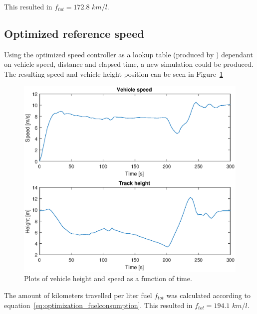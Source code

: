 This resulted in $f_{tot} = 172.8$ $km/l$. %

\subsection{Optimized reference speed}
Using the optimized speed controller as a lookup table (produced by
\citep{liu2016}) dependant on vehicle speed, distance and elapsed time, a new
simulation could be produced. The resulting speed and vehicle height position
can be seen in Figure~\ref{fig:optimization_optimal_speed}

\begin{figure}[H]
    \centering
    \includegraphics[width=\textwidth]{./img/optimization_optimal_speed.eps}
    \caption{Plots of vehicle height and speed as a function of
    time.}\label{fig:optimization_optimal_speed}
\end{figure}

The amount of kilometers travelled per liter fuel $f_{tot}$ was calculated
according to equation~\ref{eq:optimization_fuelconsumption}. This resulted in
$f_{tot} = 194.1$ $km/l$. %
